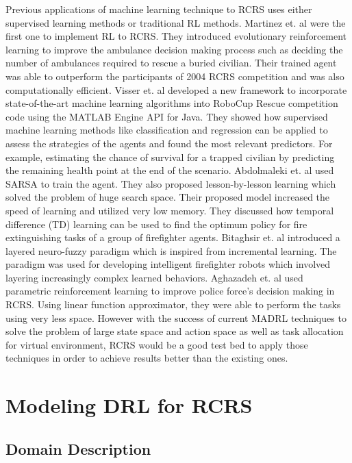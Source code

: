 \documentclass[12pt]{report}
\begin{document}
Previous applications of machine learning technique to RCRS uses either supervised learning methods or traditional RL methods. Martinez et. al \cite{Martinez} were the first one to implement RL to RCRS. They introduced evolutionary reinforcement learning to improve the ambulance decision making process such as deciding the number of ambulances required to rescue a buried civilian. Their trained agent was able to outperform the participants of 2004 RCRS competition and was also computationally efficient. Visser et. al \cite{Visser2018RoboCupRS} developed a new framework to incorporate state-of-the-art machine learning algorithms into RoboCup Rescue competition code using the MATLAB Engine API for Java. They showed how supervised machine learning methods like classification and regression can be applied to assess the strategies of the agents and found the most relevant predictors. For example, estimating the chance of survival for a trapped civilian by predicting the remaining health point at the end of the scenario. Abdolmaleki et. al \cite{abdolmaleki} used SARSA to train the agent. They also proposed lesson-by-lesson learning which solved the problem of huge search space. Their proposed model increased the speed of learning and utilized very low memory. They discussed how temporal difference (TD) learning can be used to find the optimum policy for fire extinguishing tasks of a group of firefighter agents. Bitaghsir et. al \cite{Bitaghsir} introduced a layered neuro-fuzzy paradigm which is inspired from incremental learning. The paradigm was used for developing intelligent firefighter robots which involved layering increasingly complex learned behaviors. Aghazadeh et. al \cite{Aghazadeh} used parametric reinforcement learning to improve police force's decision making in RCRS. Using linear function approximator, they were able to perform the tasks using very less space. However with the success of current MADRL techniques to solve the problem of large state space and action space as well as task allocation for virtual environment, RCRS would be a good test bed to apply those techniques in order to achieve results better than the existing ones.  

\chapter{Modeling DRL for RCRS}

\section{Domain Description}
\end{document}
